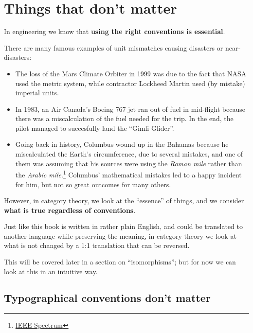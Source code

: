 \section{Things that don't matter}

In engineering we know that \textbf{using the right conventions is essential}.

There are many famous examples of unit mismatches causing disasters or near-disasters:
\begin{itemize}
    \item The loss of the Mars Climate Orbiter in 1999 was due to the fact that NASA used the metric system,
    while contractor Lockheed Martin used (by mistake) imperial units.
    \item In 1983, an Air Canada’s Boeing 767 jet ran out of fuel in mid-flight because
    there was a miscalculation of the fuel needed for the trip. In the end, the pilot managed to succesfully land the ``Gimli Glider''.
    \item
    Going back in history, Columbus wound up in the Bahamas because he miscalculated
    the Earth's circumference, due to several mistakes, and one of them was assuming
    that his sources were using the \emph{Roman mile} rather than the \emph{Arabic mile}.\footnote{
        \href{https://spectrum.ieee.org/tech-talk/at-work/test-and-measurement/columbuss-geographical-miscalculations}{IEEE Spectrum}
    }
    Columbus' mathematical mistakes led to a happy incident for him, but not so great outcomes for many others.
\end{itemize}

However, in category theory, we look at the ``essence'' of things, and we consider \textbf{what is true regardless of conventions}.

Just like this book is written in rather plain English, and could be translated to another language while preserving the meaning, in category theory we look at what is not changed by a 1:1 translation that can be reversed.

This will be covered later in a section on ``isomorphisms''; but for now we can look at this in an intuitive way.

\subsection{Typographical conventions don't matter}

